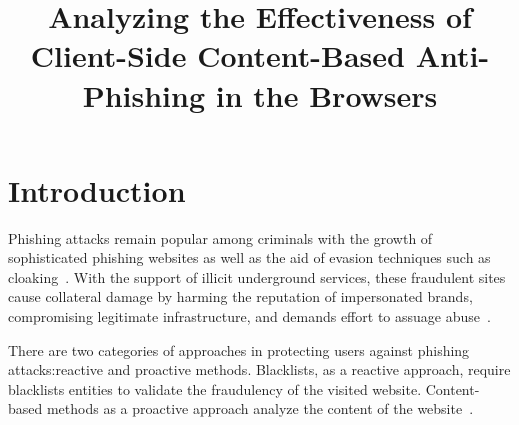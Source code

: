 \documentclass[letterpaper,twocolumn,10pt]{article}
\begin{document}
\title{\Large \bf Analyzing the Effectiveness of Client-Side Content-Based Anti-Phishing in the Browsers}
	
	
\maketitle


















\section{Introduction}
Phishing attacks remain popular among criminals with the growth of sophisticated phishing websites as well as the aid of evasion techniques such as cloaking~\cite{oest2020phishtime,internet,hao2013understanding}. With the support of illicit underground services, these fraudulent sites cause collateral damage by harming the reputation of impersonated brands, compromising legitimate infrastructure, and demands effort to assuage abuse~\cite{zhang2007cantina}.

There are two categories of approaches in protecting users against phishing attacks:reactive and proactive methods. Blacklists, as a reactive approach, require blacklists entities to validate the fraudulency of the visited website. Content-based methods as a proactive approach analyze the content of the website~\cite{wang2011verilogo}.
\end{document}
